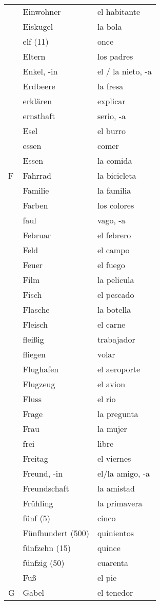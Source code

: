 \documentclass{spanish_summary}
\begin{document}
\begin{longtable}{p{} p{} | p{}}
& Einwohner & el habitante \\
& Eiskugel & la bola  \\
& elf (11) & once  \\
& Eltern & los padres  \\
& Enkel, -in & el / la nieto, -a  \\
& Erdbeere & la fresa  \\
& erklären & explicar  \\
& ernsthaft & serio, -a\\
& Esel & el burro  \\
& essen & comer \\
& Essen & la comida \\
F & Fahrrad & la bicicleta \\
& Familie & la familia   \\
& Farben & los colores  \\
& faul & vago, -a\\
& Februar & el febrero  \\
& Feld & el campo  \\
& Feuer & el fuego  \\
& Film & la pelicula  \\
& Fisch & el pescado \\
& Flasche & la botella  \\
& Fleisch & el carne \\
& fleißig & trabajador\\
& fliegen & volar \\
& Flughafen & el aeroporte \\
& Flugzeug & el avion  \\
& Fluss & el rio  \\
& Frage & la pregunta \\
& Frau & la mujer  \\
& frei & libre  \\
& Freitag & el viernes \\
& Freund, -in & el/la amigo, -a  \\
& Freundschaft & la amistad  \\
& Frühling & la primavera  \\
& fünf (5) & cinco  \\
& Fünfhundert (500) & quinientos \\
& fünfzehn (15) & quince  \\
& fünfzig (50) & cuarenta \\
& Fuß & el pie  \\
G & Gabel & el tenedor  \\

\end{longtable}
\end{document}
